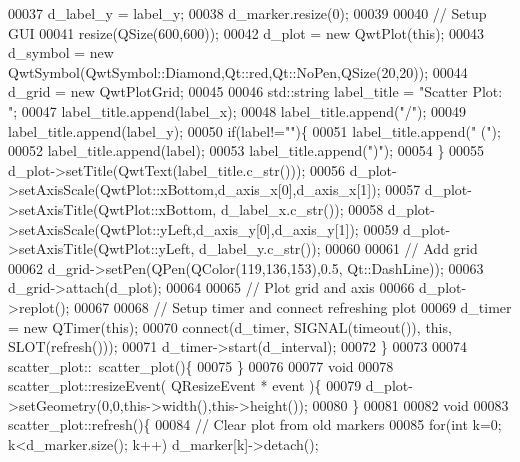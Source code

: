 \begin{DoxyCode}
00037             d_label_y = label\_y;
00038             d_marker.resize(0);
00039             
00040             \textcolor{comment}{// Setup GUI}
00041             resize(QSize(600,600));
00042             d_plot = \textcolor{keyword}{new} QwtPlot(\textcolor{keyword}{this});
00043             d_symbol = \textcolor{keyword}{new} QwtSymbol(QwtSymbol::Diamond,Qt::red,Qt::NoPen,QSize(20,20));
00044             d_grid = \textcolor{keyword}{new} QwtPlotGrid;
00045             
00046             std::string label\_title = \textcolor{stringliteral}{"Scatter Plot: "};
00047             label\_title.append(label\_x);
00048             label\_title.append(\textcolor{stringliteral}{"/"});
00049             label\_title.append(label\_y);
00050             \textcolor{keywordflow}{if}(label!=\textcolor{stringliteral}{""})\{
00051                 label\_title.append(\textcolor{stringliteral}{" ("});
00052                 label\_title.append(label);
00053                 label\_title.append(\textcolor{stringliteral}{")"});
00054             \}
00055             d_plot->setTitle(QwtText(label\_title.c\_str())); 
00056             d_plot->setAxisScale(QwtPlot::xBottom,d_axis_x[0],d_axis_x[1]);
00057             d_plot->setAxisTitle(QwtPlot::xBottom, d_label_x.c\_str());
00058             d_plot->setAxisScale(QwtPlot::yLeft,d_axis_y[0],d_axis_y[1]);
00059             d_plot->setAxisTitle(QwtPlot::yLeft, d_label_y.c\_str());
00060             
00061             \textcolor{comment}{// Add grid}
00062             d_grid->setPen(QPen(QColor(119,136,153),0.5, Qt::DashLine));
00063             d_grid->attach(d_plot);
00064             
00065             \textcolor{comment}{// Plot grid and axis}
00066             d_plot->replot();
00067             
00068             \textcolor{comment}{// Setup timer and connect refreshing plot}
00069             d_timer = \textcolor{keyword}{new} QTimer(\textcolor{keyword}{this});
00070             connect(d_timer, SIGNAL(timeout()), \textcolor{keyword}{this}, SLOT(refresh()));
00071             d_timer->start(d_interval);
00072         \}
00073 
00074         scatter_plot::~scatter_plot()\{
00075         \}
00076         
00077         \textcolor{keywordtype}{void}
00078         scatter_plot::resizeEvent( QResizeEvent * event )\{
00079             d_plot->setGeometry(0,0,this->width(),this->height());
00080         \}
00081         
00082         \textcolor{keywordtype}{void}
00083         scatter_plot::refresh()\{
00084             \textcolor{comment}{// Clear plot from old markers}
00085             \textcolor{keywordflow}{for}(\textcolor{keywordtype}{int} k=0; k<d_marker.size(); k++) d_marker[k]->detach();

\end{DoxyCode}
